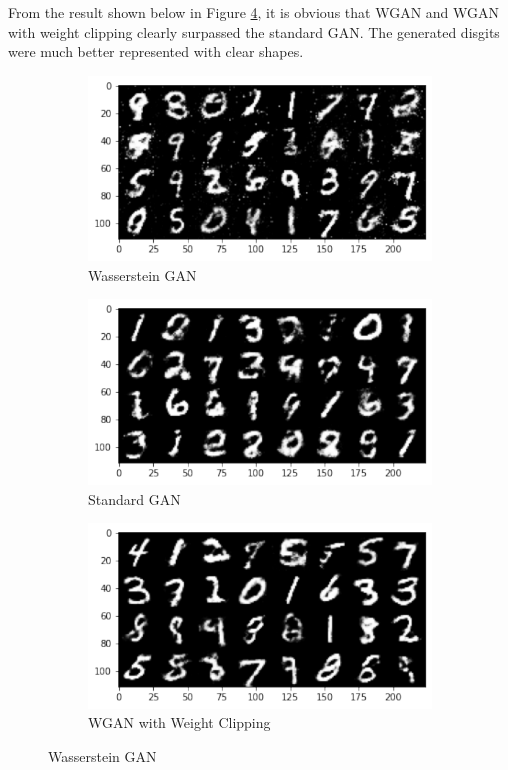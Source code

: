 \documentclass{article}
\begin{document}
From the result shown below in Figure \ref{fig:3wgan}, it is obvious that WGAN and WGAN with weight clipping clearly surpassed the standard GAN. The generated disgits were much better represented with clear shapes.

\begin{figure}[h!]
     \centering
     \begin{subfigure}[b]{0.3\textwidth}
         \centering
         \includegraphics[width=\textwidth]{lab4/wgan1.pdf}
         \caption{Wasserstein GAN}
         \label{fig:wgan}
     \end{subfigure}
     \hfill
     \begin{subfigure}[b]{0.3\textwidth}
         \centering
         \includegraphics[width=\textwidth]{lab4/wgan2.pdf}
         \caption{Standard GAN}
         \label{fig:gan}
     \end{subfigure}
     \hfill
     \begin{subfigure}[b]{0.3\textwidth}
         \centering
         \includegraphics[width=\textwidth]{lab4/wgan3.pdf}
         \caption{WGAN with Weight Clipping}
         \label{fig:wganwc}
     \end{subfigure}
        \caption{Wasserstein GAN}
        \label{fig:3wgan}
\end{figure}
\end{document}

